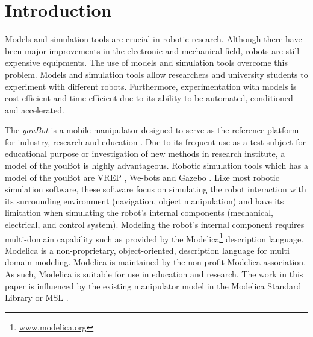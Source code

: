 \section{Introduction}
\label{sec:introduction}

Models and simulation tools are crucial in robotic research. 
Although there have been major improvements in the electronic and mechanical field, robots are still expensive equipments. 
The use of models and simulation tools overcome this problem.
Models and simulation tools allow researchers and university students to experiment with different robots. 
Furthermore, experimentation with models is cost-efficient and time-efficient due to its ability to be automated, conditioned and accelerated.

The \emph{youBot} is a mobile manipulator designed to serve as the reference platform for industry, research and education \cite{Bischoff2011}.
Due to its frequent use as a test subject for educational purpose or investigation of new methods in research institute, a model of the youBot is highly advantageous. 
Robotic simulation tools which has a model of the youBot are VREP \cite{Freese2010}, We-bots \cite{Michel2004} and Gazebo \cite{Koenig2004}.
Like most robotic simulation software, these software focus on simulating the robot interaction with its surrounding environment (navigation, object manipulation) and have its limitation when simulating the robot's internal components (mechanical, electrical, and control system).
Modeling the robot's internal component requires multi-domain capability such as provided by the Modelica\footnote{\href{https://www.modelica.org
}{www.modelica.org}} description language.
Modelica is a non-proprietary, object-oriented, description language for multi domain modeling.
Modelica is maintained by the non-profit Modelica association.
As such, Modelica is suitable for use in education and research. 
The work in this paper is influenced by the existing manipulator model in the Modelica Standard Library or MSL \cite{Elmqvist1999}.

